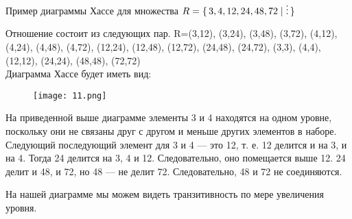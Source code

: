 \newpage
Пример диаграммы Хассе для множества $R = \set{3, 4, 12, 24, 48, 72 | \vdots}$

Отношение состоит из следующих пар.
R={(3,12), (3,24), (3,48), (3,72), (4,12), (4,24), (4,48), (4,72), (12,24), (12,48), (12,72), (24,48), (24,72), (3,3), (4,4), (12,12), (24,24), (48,48), (72,72)} \\
Диаграмма Хассе будет иметь вид:

\begin{figure}[h]
    \centering
    \texttt{[image: 11.png]}
\end{figure}

На приведенной выше диаграмме элементы 3 и 4 находятся на одном уровне,
поскольку они не связаны друг с другом и меньше других элементов в
наборе. Следующий последующий элемент для 3 и 4 — это 12, т. е. 12 делится и
на 3, и на 4. Тогда 24 делится на 3, 4 и 12. Следовательно, оно помещается выше
12. 24 делит и 48, и 72, но 48 — не делит 72. Следовательно, 48 и 72 не
соединяются.

На нашей диаграмме мы можем видеть транзитивность по мере увеличения
уровня.
